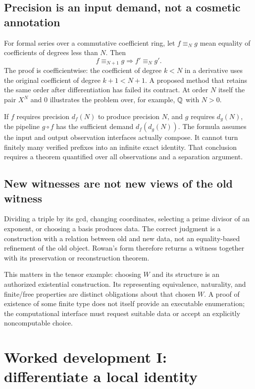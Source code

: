 \documentclass[11pt,letterpaper]{article}
\newcommand{\code}[1]{\texttt{\detokenize{#1}}}
\theoremstyle{definition}\newtheorem{definition}[theorem]{Definition}
\theoremstyle{remark}\newtheorem{remark}[theorem]{Remark}
\begin{document}
\subsection{Precision is an input demand, not a cosmetic annotation}
For formal series over a commutative coefficient ring, let $f\equiv_N g$
mean equality of coefficients of degrees less than $N$. Then
\[
 f\equiv_{N+1}g\Longrightarrow f'\equiv_N g'.
\]
The proof is coefficientwise: the coefficient of degree $k<N$ in a derivative
uses the original coefficient of degree $k+1<N+1$. A proposed method that
retains the same order after differentiation has failed its contract. At
order $N$ itself the pair $X^N$ and $0$ illustrates the problem over, for
example, $\mathbb Q$ with $N>0$.

If $f$ requires precision $d_f(N)$ to produce precision $N$, and $g$ requires
$d_g(N)$, the pipeline $g\circ f$ has the sufficient demand
$d_f(d_g(N))$. The formula assumes the input and output observation interfaces
actually compose. It cannot turn finitely many verified prefixes into an
infinite exact identity. That conclusion requires a theorem quantified over
all observations and a separation argument.

\subsection{New witnesses are not new views of the old witness}
Dividing a triple by its gcd, changing coordinates, selecting a prime divisor
of an exponent, or choosing a basis produces data. The correct judgment is a
construction with a relation between old and new data, not an equality-based
refinement of the old object. Rowan's \code{obtain} form therefore returns a
witness together with its preservation or reconstruction theorem.

This matters in the tensor example: choosing $W$ and its structure is an
authorized existential construction. Its representing equivalence, naturality,
and finite/free properties are distinct obligations about that chosen $W$.
A proof of existence of some finite type does not itself provide an executable
enumeration; the computational interface must request suitable data or accept
an explicitly noncomputable choice.

\section{Worked development I: differentiate a local identity}
\label{sec:ode}
\end{document}
